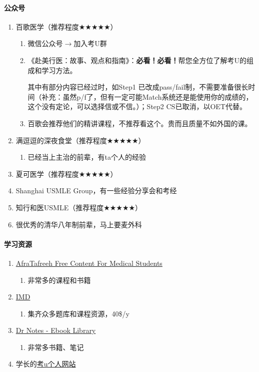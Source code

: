 \documentclass[zihao=-4,fontset=none]{Beautybook-CN}
\begin{document}
\paragraph{公众号}
\begin{enumerate}
\item 百歌医学（推荐程度${\bigstar}$${\bigstar}$${\bigstar}$${\bigstar}$${\bigstar}$）
\begin{enumerate}[]
\item 微信公众号${\rightarrow}$加入考U群
\item 《赴美行医：故事、观点和指南》：\textbf{必看！必看！}帮您全方位了解考U的组成和学习方法。
\begin{theorem}
    其中有部分内容已经过时，如Step1 已改成pass/fail制，不需要准备很长时间（补充：虽然p/f了，但有一定可能Match系统还是能使用你的成绩的，这个没有定论，可以选择信或不信。）；Step2 CS已取消，以OET代替。
\end{theorem}
\item 百歌会推荐他们的精讲课程，不推荐看这个。贵而且质量不如外国的课。
\end{enumerate}
\item 满逗逗的深夜食堂（推荐程度${\bigstar}$${\bigstar}$${\bigstar}$${\bigstar}$${\bigstar}$）
\begin{enumerate}
\item 已经当上主治的前辈，有ta个人的经验
\end{enumerate}
\item 夏可医学（推荐程度${\bigstar}$${\bigstar}$${\bigstar}$${\bigstar}$${\bigstar}$）
\item Shanghai USMLE Group，有一些经验分享会和考经
\item 知行和医USMLE（推荐程度${\bigstar}$${\bigstar}$${\bigstar}$${\bigstar}$${\bigstar}$）
\item 很优秀的清华八年制前辈，马上要麦外科
\end{enumerate}
\paragraph{学习资源}


\begin{enumerate}
\item \href{https://afratafreeh.com/\#tdsub}{AfraTafreeh {\textbar} Free Content For Medical Students}
\begin{enumerate}
\item 非常多的课程和书籍
\end{enumerate}

\item \href{https://en.imedicaldoctor.net/}{IMD}
\begin{enumerate}
\item 集齐众多题库和课程资源，40\$/y
\end{enumerate}

\item \href{https://dr-notes.com/\#tdsub}{Dr Notes - Ebook Library}
\begin{enumerate}
\item 非常多书籍、笔记
\end{enumerate}

\item 学长的\href{https://www.h4rvey.com/}{考u个人网站}
\end{enumerate}
\end{document}
